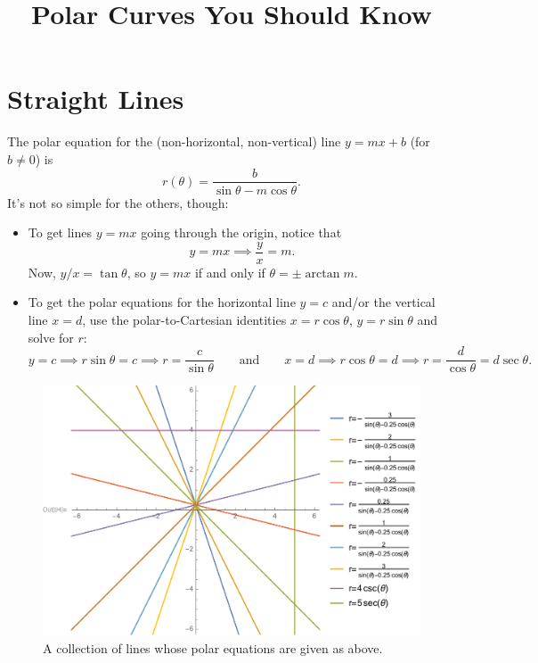 \documentclass[12pt]{article}
\title{\vspace{-0.75in}\Huge{Polar Curves You Should Know}\vspace{-0.5in}}
\date{}
\begin{document}
	\maketitle

	\section*{Straight Lines}
	The polar equation for the (non-horizontal, non-vertical) line $y=mx+b$ (for $b\neq 0$) is
	$$r(\theta)=\frac{b}{\sin{\theta}-m\cos{\theta}}.$$
	It's not so simple for the others, though:
	\begin{itemize}
		\item To get lines $y=mx$ going through the origin, notice that
		$$y=mx\implies \frac{y}{x}=m.$$
		Now, $y/x=\tan{\theta}$, so $y=mx$ if and only if $\theta=\pm\arctan{m}$.
		\item To get the polar equations for the horizontal line $y=c$ and/or the vertical line $x=d$, use the polar-to-Cartesian identities $x=r\cos\theta$, $y=r\sin\theta$ and solve for $r$:
		$$y=c \implies r\sin{\theta}=c \implies r = \frac{c}{\sin{\theta}}\quad\quad\text{and}\quad\quad x=d \implies r\cos{\theta}=d \implies r = \frac{d}{\cos{\theta}}=d\sec{\theta}.$$
	\end{itemize}
	\begin{figure}[h!]
		\begin{center}
		\includegraphics[trim={13mm 0 0 0}, clip, scale=0.625]{1_Lines}
		\caption{A collection of lines whose polar equations are given as above.}
		\end{center}
	\end{figure}
	
\end{document}
